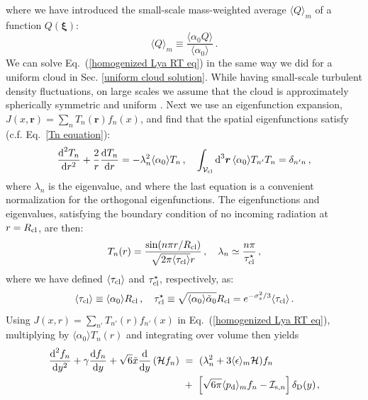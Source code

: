 \documentclass[fleqn,usenatbib]{mnras}
\newcommand{\taucl}{\tau_{\rm cl}}
\newcommand\HI{\ion{H}{I}\xspace} %
\begin{document}
where we have introduced the small-scale \HI mass-weighted average $\langle Q \rangle_{m}$ of a function $Q(\boldsymbol{\xi})$:
\begin{equation}
    \langle Q \rangle_{m} \equiv \dfrac{\langle \alpha_0 Q \rangle}{\langle \alpha_0 \rangle} \, .
\end{equation}
We can solve Eq.~(\ref{homogenized Lya RT eq}) in the same way we did for a uniform cloud in Sec. \ref{uniform cloud solution}. While having small-scale turbulent density fluctuations, on large scales we assume that the cloud is approximately spherically symmetric and uniform \citep[for a similar setup in simulations of star formation in turbulent GMCs, see][]{Lane2022}. Next we use an eigenfunction expansion, $J(x,\boldsymbol{r}) = \sum_n T_n(\boldsymbol{r}) f_n(x)$, and find that the spatial eigenfunctions satisfy (c.f. Eq.~\ref{Tn equation}):
\begin{equation}
    \dfrac{\textrm{d}^2 T_n}{\textrm{d} r^2} + \dfrac{2}{r} \dfrac{\textrm{d} T_n}{\textrm{d} r} = - \lambda_n^2 \langle \alpha_0 \rangle T_n \, , \quad \int_{\mathcal{V}_{\rm cl}} \textrm{d}^3 \boldsymbol{r} \, \langle \alpha_0 \rangle  T_{n'} T_n = \delta_{n'n} \, ,
\end{equation}
where $\lambda_n$ is the eigenvalue, and where the last equation is a convenient normalization for the orthogonal eigenfunctions. The eigenfunctions and eigenvalues, satisfying the boundary condition of no incoming radiation at $r = R_{\rm cl}$, are then:
\begin{equation}
    T_n(r) = \dfrac{\sin(n \pi r/R_{\rm cl})}{ \sqrt{2 \pi \langle \taucl \rangle} r} \, , \quad \lambda_n \simeq \dfrac{n \pi}{\taucl^{\star}} \, ,
\end{equation}
where we have defined $\langle \taucl \rangle$ and $\taucl^{\star}$, respectively, as:
\begin{equation}
    \langle \taucl \rangle \equiv \langle \alpha_0 \rangle R_{\rm cl} \, , \quad \taucl^{\star} \equiv \sqrt{\langle \alpha_0 \rangle \Tilde{\alpha}_0} R_{\rm cl} = e^{- \sigma_s^2/3} \langle \taucl \rangle \, .
\end{equation}
Using $J(x,r) = \sum_{n'} T_{n'}(r) f_{n'}(x)$ in Eq.~(\ref{homogenized Lya RT eq}), multiplying by $\langle \alpha_0 \rangle T_n(r)$ and integrating over volume then yields
\begin{align}
    \dfrac{\textrm{d}^2 f_n}{\textrm{d}y^2} + \gamma \dfrac{\textrm{d} f_n}{\textrm{d}y} + \sqrt{6} \Bar{x} \dfrac{\textrm{d}}{\textrm{d}y} \left( \mathcal{H} f_n \right)  ~&=~ (\lambda_n^2 + 3 \langle \epsilon \rangle_{ m} \mathcal{H} )f_n  \label{freqeq non uniform} \\~&+~ \left[ \sqrt{6 \pi} \langle p_{\rm d} \rangle_{m} f_n - \mathcal{I}_{\textrm{s},n} \right] \delta_{\rm D}(y) \hspace{1 pt} , \nonumber
\end{align}
\end{document}
